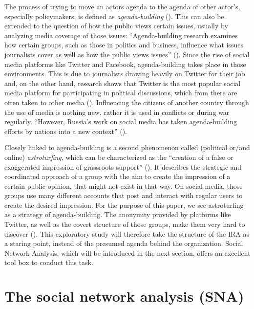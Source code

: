 \documentclass[12pt, titlepage=true, toc=bib]{scrartcl}
\begin{document}
The process of trying to move an actors agenda to the agenda of other actor's, especially policymakers, is defined as \textit{agenda-building} (\cite[3]{linvill_troll_2018}). This can also be extended to the question of how the public views certain issues, usually by analyzing media coverage of those issues: ``Agenda-building research examines how certain groups, such as those in politics and business, influence what issues journalists cover as well as how the public views issues'' (\cite[434]{parmelee_agenda-building_2014}). Since the rise of social media platforms like Twitter and Facebook, agenda-building takes place in those environments. This is due to journalists drawing heavily on Twitter for their job and, on the other hand, research shows that Twitter is the most popular social media platform for participating in political discussions, which from there are often taken to other media (\cite[435, 437]{parmelee_agenda-building_2014}). Influencing the citizens of another country through the use of media is nothing new, rather it is used in conflicts or during war regularly. ``However, Russia's work on social media has taken agenda-building efforts by nations into a new context'' (\cite[3]{linvill_troll_2018}).

Closely linked to agenda-building is a second phenomenon called (political or/and online) \textit{astroturfing}, which can be characterized as the ``creation of a false or exaggerated impression of grassroots support'' (\cite{harcup_astroturfing_2014}). It describes the strategic and coordinated approach of a group with the aim to create the impression of a certain public opinion, that might not exist in that way. On social media, those groups use many different accounts that post and interact with regular users to create the desired impression. For the purpose of this paper, we see astroturfing as a strategy of agenda-building. The anonymity provided by platforms like Twitter, as well as the covert structure of those groups, make them very hard to discover (\cite[564]{yang_how_2017}). This exploratory study will therefore take the structure of the IRA as a staring point, instead of the presumed agenda behind the organization. Social Network Analysis, which will be introduced in the next section, offers an excellent tool box to conduct this task.


\section{The social network analysis (SNA)}
\end{document}
